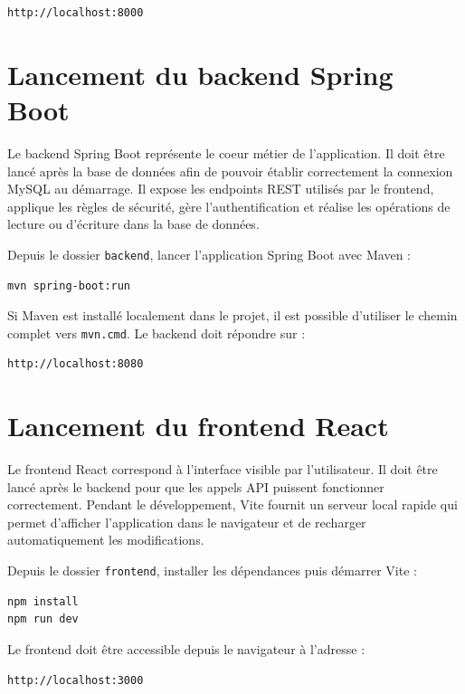 \documentclass[12pt,a4paper]{report}
\begin{document}
\begin{verbatim}
http://localhost:8000
\end{verbatim}

\section{Lancement du backend Spring Boot}

Le backend Spring Boot représente le coeur métier de l'application. Il doit être lancé après la base de données afin de pouvoir établir correctement la connexion MySQL au démarrage. Il expose les endpoints REST utilisés par le frontend, applique les règles de sécurité, gère l'authentification et réalise les opérations de lecture ou d'écriture dans la base de données.

Depuis le dossier \texttt{backend}, lancer l'application Spring Boot avec Maven :

\begin{verbatim}
mvn spring-boot:run
\end{verbatim}

Si Maven est installé localement dans le projet, il est possible d'utiliser le chemin complet vers \texttt{mvn.cmd}. Le backend doit répondre sur :

\begin{verbatim}
http://localhost:8080
\end{verbatim}

\section{Lancement du frontend React}

Le frontend React correspond à l'interface visible par l'utilisateur. Il doit être lancé après le backend pour que les appels API puissent fonctionner correctement. Pendant le développement, Vite fournit un serveur local rapide qui permet d'afficher l'application dans le navigateur et de recharger automatiquement les modifications.

Depuis le dossier \texttt{frontend}, installer les dépendances puis démarrer Vite :

\begin{verbatim}
npm install
npm run dev
\end{verbatim}

Le frontend doit être accessible depuis le navigateur à l'adresse :

\begin{verbatim}
http://localhost:3000
\end{verbatim}
\end{document}
